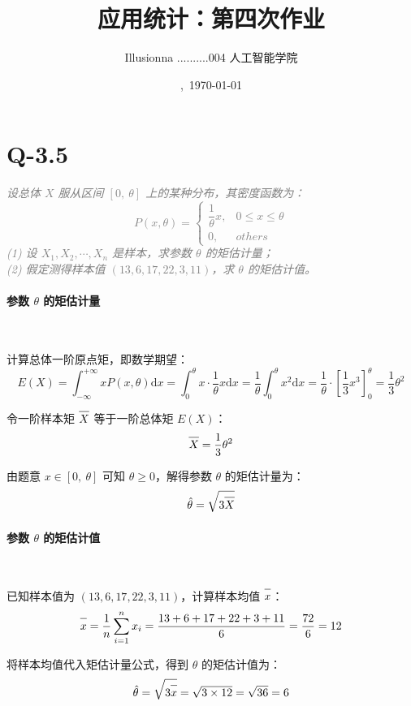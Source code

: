\documentclass{article}
\title{\vspace{-3em}应用统计：第四次作业}
\author{Illusionna \quad 2025..........004 \quad 人工智能学院}
\date{\currenttime,\ \today}
\renewcommand{\d}{\mathrm{d}}
\newcommand{\barline}[1]{\overline{#1\rule{0pt}{1.9ex}}}
\begin{document}
\maketitle\vspace*{-1.5em}



\section{Q-3.5}
\textit{\textcolor{gray}{设总体 $X$ 服从区间 $[0,\ \theta]$ 上的某种分布，其密度函数为：
\[ P(x, \theta) = \begin{cases} 
    \dfrac{1}{\theta}x, & 0 \leqslant x \leqslant \theta
    \\[7pt]
    0, & others
\end{cases} \]
(1) 设 $X_1, X_2, \cdots, X_n$ 是样本，求参数 $\theta$ 的矩估计量；\\[5pt]
(2) 假定测得样本值 $(13, 6, 17, 22, 3, 11)$，求 $\theta$ 的矩估计值。}}

\paragraph*{参数 $\theta$ 的矩估计量}~{}

计算总体一阶原点矩，即数学期望：
\[ E(X) = \int_{-\infty}^{+\infty} x P(x, \theta) \d x = \int_{0}^{\theta} x \cdot \dfrac{1}{\theta}x \d x = \dfrac{1}{\theta} \int_{0}^{\theta} x^2 \d x = \dfrac{1}{\theta} \cdot \left[ \dfrac{1}{3}x^3 \right]_{0}^{\theta} = \dfrac{1}{3}\theta^2 \]

令一阶样本矩 $\barline{X}$ 等于一阶总体矩 $E(X)$：
\[ \barline{X} = \dfrac{1}{3}\theta^2 \]

由题意 $x \in [0,\ \theta]$ 可知 $\theta \geqslant 0$，解得参数 $\theta$ 的矩估计量为：
\[ \hat{\theta} = \sqrt{3\barline{X}} \]

\paragraph*{参数 $\theta$ 的矩估计值}~{}

已知样本值为 $(13, 6, 17, 22, 3, 11)$，计算样本均值 $\barline{x}$：
\[ \barline{x} = \dfrac{1}{n}\sum_{i=1}^{n}x_i = \dfrac{13 + 6 + 17 + 22 + 3 + 11}{6} = \dfrac{72}{6} = 12 \]

将样本均值代入矩估计量公式，得到 $\theta$ 的矩估计值为：
\[ \hat{\theta} = \sqrt{3\barline{x}} = \sqrt{3 \times 12} = \sqrt{36} = 6 \]
\end{document}

